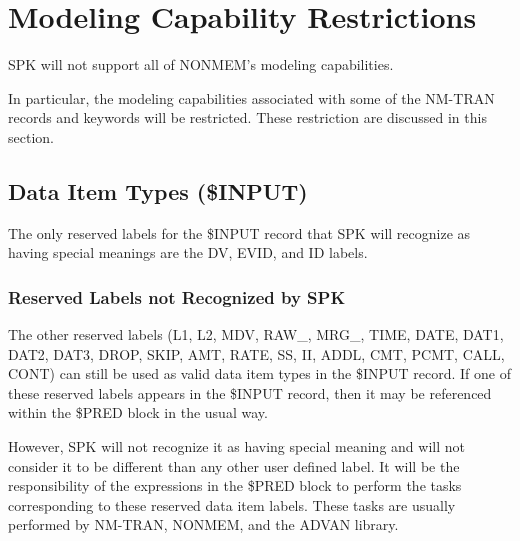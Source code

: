 \documentclass{article}
\begin{document}
%
\begin{center}
\end{center}
%



%
\section{Modeling Capability Restrictions}
%

SPK will not support all of NONMEM's modeling capabilities.

In particular, the modeling capabilities associated with some 
of the NM-TRAN records and keywords will be restricted.
These restriction are discussed in this section.


\subsection{Data Item Types (\$INPUT)}

The only reserved labels for the \$INPUT record that SPK will
recognize as having special meanings are the DV, EVID, and
ID labels.


\subsubsection{Reserved Labels not Recognized by SPK}

The other reserved labels
(L1, L2, MDV, RAW\_, MRG\_, TIME, DATE, DAT1, DAT2, DAT3, 
DROP, SKIP, AMT, RATE, SS, II, ADDL, CMT, PCMT, CALL, CONT)
can still be used as valid 
data item types in the \$INPUT record.
If one of these reserved labels appears in the \$INPUT record, 
then it may  be referenced within the \$PRED block in the usual way.

However, SPK will not recognize it as having special meaning and will
not consider it to be different than any other user defined label.
It will be the responsibility of the expressions in the \$PRED block to 
perform the tasks corresponding to these reserved data item labels.
These tasks are usually performed by NM-TRAN, NONMEM, and the
ADVAN library.
\end{document}
